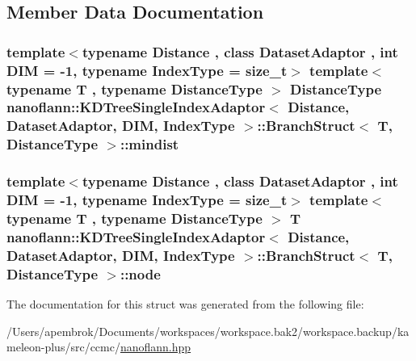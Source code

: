 \subsection{Member Data Documentation}
\hypertarget{structnanoflann_1_1_k_d_tree_single_index_adaptor_1_1_branch_struct_aa62cca16bd04ba7fd2ef25b3d3e8a6fa}{
\subsubsection[{mindist}]{\setlength{\rightskip}{0pt plus 5cm}template$<$typename Distance , class Dataset\-Adaptor , int D\-I\-M = -\/1, typename Index\-Type  = size\-\_\-t$>$ template$<$typename T , typename Distance\-Type $>$ {\bf Distance\-Type} {\bf nanoflann\-::\-K\-D\-Tree\-Single\-Index\-Adaptor}$<$ Distance, Dataset\-Adaptor, D\-I\-M, Index\-Type $>$\-::{\bf Branch\-Struct}$<$ T, {\bf Distance\-Type} $>$\-::mindist}}\label{structnanoflann_1_1_k_d_tree_single_index_adaptor_1_1_branch_struct_aa62cca16bd04ba7fd2ef25b3d3e8a6fa}
\hypertarget{structnanoflann_1_1_k_d_tree_single_index_adaptor_1_1_branch_struct_a86bcc74bb89be6b93db206feb8a3aad7}{
\subsubsection[{node}]{\setlength{\rightskip}{0pt plus 5cm}template$<$typename Distance , class Dataset\-Adaptor , int D\-I\-M = -\/1, typename Index\-Type  = size\-\_\-t$>$ template$<$typename T , typename Distance\-Type $>$ T {\bf nanoflann\-::\-K\-D\-Tree\-Single\-Index\-Adaptor}$<$ Distance, Dataset\-Adaptor, D\-I\-M, Index\-Type $>$\-::{\bf Branch\-Struct}$<$ T, {\bf Distance\-Type} $>$\-::node}}\label{structnanoflann_1_1_k_d_tree_single_index_adaptor_1_1_branch_struct_a86bcc74bb89be6b93db206feb8a3aad7}


The documentation for this struct was generated from the following file\-:\begin{DoxyCompactItemize}
\item 
/\-Users/apembrok/\-Documents/workspaces/workspace.\-bak2/workspace.\-backup/kameleon-\/plus/src/ccmc/\hyperlink{nanoflann_8hpp}{nanoflann.\-hpp}\end{DoxyCompactItemize}

